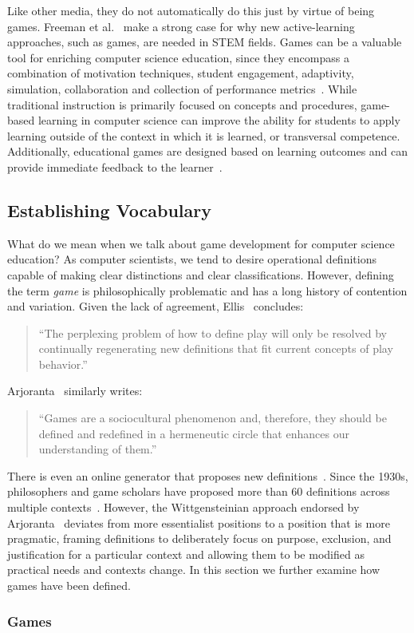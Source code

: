 \documentclass{sig-alternate-05-2015}
\begin{document}
Like other media, they do not automatically do this just by virtue of being games.  Freeman et al.~\cite{freeman2014active} make a strong case for why new active-learning approaches, such as games, are needed in STEM fields. Games can be a valuable tool for enriching computer science education, since they encompass a combination of motivation techniques, student engagement, adaptivity, simulation, collaboration and collection of performance metrics~\cite{gros15integration}. While traditional instruction is primarily focused on concepts and procedures, game-based learning in computer science can improve the ability for students to apply learning outside of the context in which it is learned, or transversal competence. Additionally, educational games are designed based on learning outcomes and can provide immediate feedback to the learner~\cite{dickey2005engaging}. \subsection{Establishing Vocabulary}


What do we mean when we talk about game development for computer science education? As computer scientists, we tend to desire operational definitions capable of making clear distinctions and clear classifications. However, defining the term {\em game} is philosophically problematic and has a long history of contention and variation. Given the lack of agreement, Ellis~\cite{ellis1973whyPlay} concludes:\begin{quote}


``The perplexing problem of how to define play will only be resolved by continually regenerating new definitions that fit current concepts of play behavior.''\end{quote}


Arjoranta~\cite{arjoranta2014-gameDefinitions} similarly writes:\begin{quote}


``Games are a sociocultural phenomenon and, therefore, they should be defined and redefined in a hermeneutic circle that enhances our understanding of them.''\end{quote}




There is even an online generator that proposes new definitions~\cite{molleindustria2013-defines,ferri2013rhetorics}. Since the 1930s, philosophers and game scholars have proposed more than 60 definitions across multiple contexts~\cite{stenros2016review-definingGames}. However, the Wittgensteinian approach endorsed by Arjoranta~\cite{arjoranta2014-gameDefinitions} deviates from more essentialist positions to a position that is more pragmatic, framing definitions to deliberately focus on purpose, exclusion, and justification for a particular context and allowing them to be modified as practical needs and contexts change. In this section we further examine how games have been defined.\subsubsection{Games}
\end{document}
